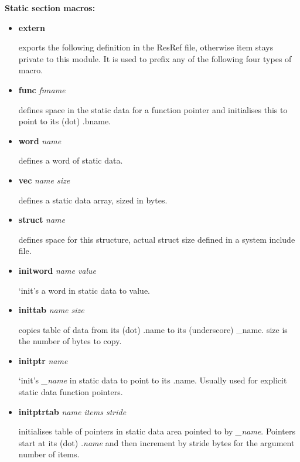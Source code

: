 {\bf Static section macros:}
\vspace{0.25cm}

\begin{itemize}

\item {\bf extern}

exports the following definition in the ResRef file, otherwise
item stays private to this module. It is used to prefix
any of the following four types of macro.

\item {\bf func} {\it fnname}

defines space in the static data for a function pointer
and initialises this to point to its (dot) .bname.

\item {\bf word} {\it name}

defines a word of static data.

\item {\bf vec} {\it name size} 

defines a static data array, sized in bytes.

\item {\bf struct} {\it name} 

defines space for this structure, actual struct size
defined in a system include file.

\item {\bf initword} {\it name value}

`init's a word in static data to value.

\item {\bf inittab} {\it name size} 

copies table of data from its (dot) .name
to its (underscore) \_name. size is the number of bytes to copy. 

\item {\bf initptr} {\it name} 

`init's {\it \_name} in static data to point
to its .name. Usually used for explicit static data function pointers.

\item {\bf initptrtab} {\it name items stride} 

initialises table of pointers in static
data area pointed to by {\it \_name}.
Pointers start at its (dot) {\it .name} and then increment by
stride bytes for the argument number of items.
\end{itemize}
\vspace{0.25cm}


